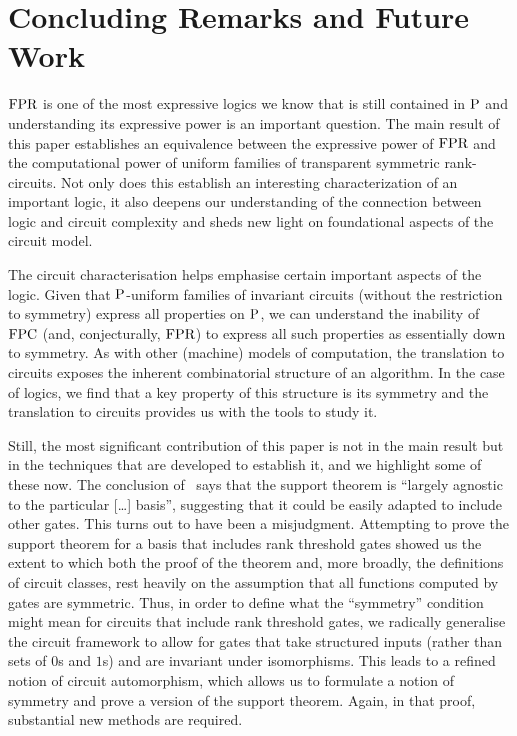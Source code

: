 \documentclass[a4paper,UKenglish]{lipics-v2018}
\begin{document}
\section{Concluding Remarks and Future Work}
$\text{\upshape FPR}$ is one of the most expressive logics we know that is still contained in
$\mathrm{P}$ and understanding its expressive power is an important question. The main
result of this paper establishes an equivalence between the expressive power of
$\text{\upshape FPR}$ and the computational power of uniform families of transparent symmetric
rank-circuits. Not only does this establish an interesting characterization of
an important logic, it also deepens our understanding of the connection between
logic and circuit complexity and sheds new light on foundational aspects of the
circuit model.

The circuit characterisation helps emphasise certain important aspects of the
logic. Given that $\mathrm{P}$-uniform families of invariant circuits (without the
restriction to symmetry) express all properties on $\mathrm{P}$, we can understand the
inability of $\text{\upshape FPC}$ (and, conjecturally, $\text{\upshape FPR}$) to express all such properties
as essentially down to symmetry. As with other (machine) models of computation,
the translation to circuits exposes the inherent combinatorial structure of an
algorithm. In the case of logics, we find that a key property of this structure
is its symmetry and the translation to circuits provides us with the tools to
study it.

Still, the most significant contribution of this paper is not in the main result
but in the techniques that are developed to establish it, and we highlight some
of these now. The conclusion of~\cite{AndersonD17} says that the support theorem
is ``largely agnostic to the particular [\ldots] basis'', suggesting that it
could be easily adapted to include other gates. This turns out to have been a
misjudgment. Attempting to prove the support theorem for a basis that includes
rank threshold gates showed us the extent to which both the proof of the theorem
and, more broadly, the definitions of circuit classes, rest heavily on the
assumption that all functions computed by gates are symmetric. Thus, in order to
define what the ``symmetry'' condition might mean for circuits that include rank
threshold gates, we radically generalise the circuit framework to allow for
gates that take structured inputs (rather than sets of $0$s and $1$s) and are
invariant under isomorphisms. This leads to a refined notion of circuit
automorphism, which allows us to formulate a notion of symmetry and prove a
version of the support theorem. Again, in that proof, substantial new methods
are required.
\end{document}
